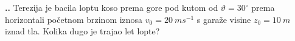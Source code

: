 

\noindent 
\textbf{
\thecjelina.\thezadatak.}
Terezija je bacila loptu koso prema gore pod kutom od $\vartheta=30^\circ$  prema horizontali početnom brzinom iznosa $v_0=20\ ms^{-1}$  s garaže visine $z_0=10\ m$ iznad tla. Kolika dugo je trajao let lopte?


